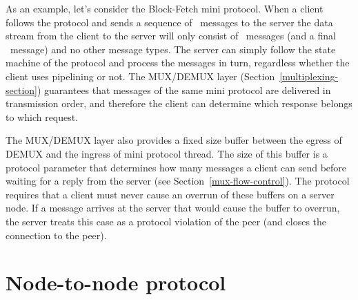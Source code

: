 As an example, let's consider the Block-Fetch mini protocol.
When a client follows the protocol and sends a sequence of \MsgRequestRange~messages to the server
the data stream from the client to the server will only consist of \MsgRequestRange~messages
(and a final \MsgClientDone~message) and no other message types.
The server can simply follow the state machine of the protocol and process the messages in turn,
regardless whether the client uses pipelining or not.
The MUX/DEMUX layer (Section~\ref{multiplexing-section}) guarantees
that messages of the same mini protocol are delivered in transmission order,
and therefore the client can determine which response belongs to which request.

The MUX/DEMUX layer also provides a fixed size buffer between the egress of DEMUX and the ingress
of mini protocol thread.
The size of this buffer is a protocol parameter that determines how many messages
a client can send before waiting for a reply from the server (see Section~\ref{mux-flow-control}).
The protocol requires that a client must never cause an overrun of these buffers on a server node.
If a message arrives at the server that would cause the buffer to overrun,
the server treats this case as a protocol violation of the peer
(and closes the connection to the peer).

\section{Node-to-node protocol}
\label{section:node-to-node-protocol}
\newline
{}\newline

